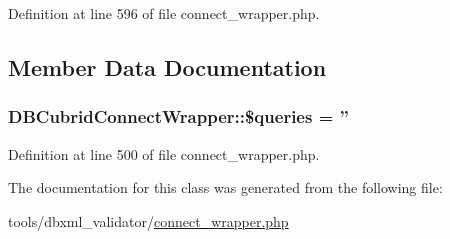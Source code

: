 Definition at line 596 of file connect\+\_\+wrapper.\+php.



\subsection{Member Data Documentation}
\hypertarget{classDBCubridConnectWrapper_a81badd33a22bbce8ada6ae0d0d408867}{
\subsubsection[{\$queries}]{\setlength{\rightskip}{0pt plus 5cm}D\+B\+Cubrid\+Connect\+Wrapper\+::\$queries = ''}}\label{classDBCubridConnectWrapper_a81badd33a22bbce8ada6ae0d0d408867}


Definition at line 500 of file connect\+\_\+wrapper.\+php.



The documentation for this class was generated from the following file\+:\begin{DoxyCompactItemize}
\item 
tools/dbxml\+\_\+validator/\hyperlink{connect__wrapper_8php}{connect\+\_\+wrapper.\+php}\end{DoxyCompactItemize}

